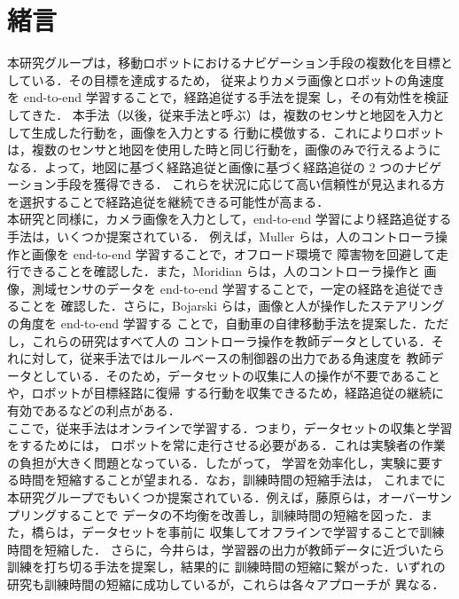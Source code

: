\documentclass{jarticle}
\begin{document}
\date{} %

\maketitle
\thispagestyle{empty}
\pagestyle{empty}

\small
\section{緒言\protect\\}
本研究グループは，移動ロボットにおけるナビゲーション手段の複数化を目標としている．その目標を達成するため，
従来よりカメラ画像とロボットの角速度を end-to-end 学習することで，経路追従する手法を提案
し，その有効性を検証してきた\cite{okada}\cite{okada2}\cite{kiyooka}．
本手法（以後，従来手法と呼ぶ）は，複数のセンサと地図を入力として生成した行動を，画像を入力とする
行動に模倣する．これによりロボットは，複数のセンサと地図を使用した時と同じ行動を，画像のみで行えるように
なる．よって，地図に基づく経路追従と画像に基づく経路追従の 2 つのナビゲーション手段を獲得できる．
これらを状況に応じて高い信頼性が見込まれる方を選択することで経路追従を継続できる可能性が高まる．\\
\hspace*{1zw}本研究と同様に，カメラ画像を入力として，end-to-end 学習により経路追従する手法は，いくつか提案されている．
例えば，Muller らは，人のコントローラ操作と画像を end-to-end 学習することで，オフロード環境で
障害物を回避して走行できることを確認した\cite{off_load}．また，Moridian らは，人のコントローラ操作と
画像，測域センサのデータを end-to-end 学習することで，一定の経路を追従できることを
確認した\cite{Moridian}．さらに，Bojarski らは，画像と人が操作したステアリングの角度を end-to-end 学習する
ことで，自動車の自律移動手法を提案した\cite{Bojarski}．ただし，これらの研究はすべて人の
コントローラ操作を教師データとしている．それに対して，従来手法ではルールベースの制御器の出力である角速度を
教師データとしている．そのため，データセットの収集に人の操作が不要であることや，ロボットが目標経路に復帰
する行動を収集できるため，経路追従の継続に有効である\cite{imai}などの利点がある．\\
\hspace*{1zw}ここで，従来手法はオンラインで学習する．つまり，データセットの収集と学習をするためには，
ロボットを常に走行させる必要がある．これは実験者の作業の負担が大きく問題となっている．したがって，
学習を効率化し，実験に要する時間を短縮することが望まれる．なお，訓練時間の短縮手法は，
これまでに本研究グループでもいくつか提案されている．例えば，藤原らは，オーバーサンプリングすることで
データの不均衡を改善し，訓練時間の短縮を図った\cite{fuji}．また，橋らは，データセットを事前に
収集してオフラインで学習することで訓練時間を短縮した\cite{takahashi}．
さらに，今井らは，学習器の出力が教師データに近づいたら訓練を打ち切る手法を提案し，結果的に
訓練時間の短縮に繋がった\cite{imai2}．いずれの研究も訓練時間の短縮に成功しているが，これらは各々アプローチが
異なる．
\end{document}
